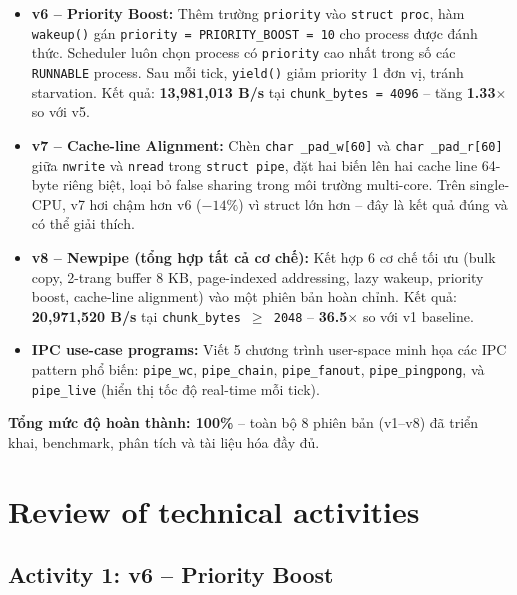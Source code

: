 \documentclass[11pt,a4paper]{article}
\begin{document}
\begin{itemize}
  \item \textbf{v6 -- Priority Boost:} Thêm trường \texttt{priority} vào \texttt{struct proc}, hàm \texttt{wakeup()} gán \texttt{priority = PRIORITY\_BOOST = 10} cho process được đánh thức. Scheduler luôn chọn process có \texttt{priority} cao nhất trong số các \texttt{RUNNABLE} process. Sau mỗi tick, \texttt{yield()} giảm priority 1 đơn vị, tránh starvation. Kết quả: \textbf{13{,}981{,}013 B/s} tại \texttt{chunk\_bytes = 4096} -- tăng \textbf{1.33$\times$} so với v5.
  \item \textbf{v7 -- Cache-line Alignment:} Chèn \texttt{char \_pad\_w[60]} và \texttt{char \_pad\_r[60]} giữa \texttt{nwrite} và \texttt{nread} trong \texttt{struct pipe}, đặt hai biến lên hai cache line 64-byte riêng biệt, loại bỏ false sharing trong môi trường multi-core. Trên single-CPU, v7 hơi chậm hơn v6 ($-14\%$) vì struct lớn hơn -- đây là kết quả đúng và có thể giải thích.
  \item \textbf{v8 -- Newpipe (tổng hợp tất cả cơ chế):} Kết hợp 6 cơ chế tối ưu (bulk copy, 2-trang buffer 8 KB, page-indexed addressing, lazy wakeup, priority boost, cache-line alignment) vào một phiên bản hoàn chỉnh. Kết quả: \textbf{20{,}971{,}520 B/s} tại \texttt{chunk\_bytes $\geq$ 2048} -- \textbf{36.5$\times$} so với v1 baseline.
  \item \textbf{IPC use-case programs:} Viết 5 chương trình user-space minh họa các IPC pattern phổ biến: \texttt{pipe\_wc}, \texttt{pipe\_chain}, \texttt{pipe\_fanout}, \texttt{pipe\_pingpong}, và \texttt{pipe\_live} (hiển thị tốc độ real-time mỗi tick).
\end{itemize}

\textbf{Tổng mức độ hoàn thành: 100\%} -- toàn bộ 8 phiên bản (v1--v8) đã triển khai, benchmark, phân tích và tài liệu hóa đầy đủ.

\section{Review of technical activities}

\subsection{Activity 1: v6 -- Priority Boost}
\end{document}
